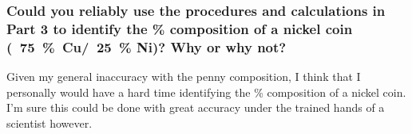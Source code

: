 \documentclass[a4paper,10pt]{article}
\begin{document}
\subsubsection*{Could you reliably use the procedures and calculations in Part 3 to identify the \% composition of a nickel coin (~75~\%~Cu/~25~\% Ni)? Why or why not?}
Given my general inaccuracy with the penny composition, I think that I personally would have a hard time identifying the \% composition of a nickel coin. I'm sure this could be done with great accuracy under the trained hands of a scientist however.  
\end{document}
